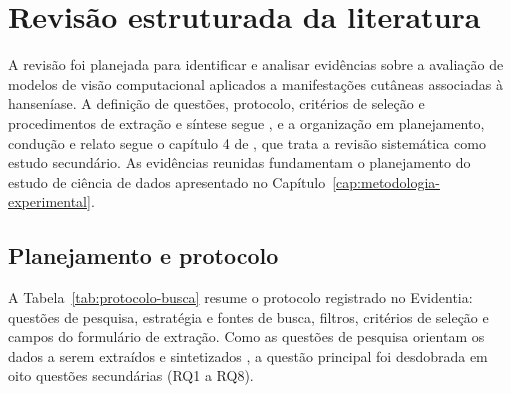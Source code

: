 \chapter{Revisão estruturada da literatura}
\label{cap:revisao-literatura}
\label{sec:conducao-revisao}

A revisão foi planejada para identificar e analisar evidências sobre a
avaliação de modelos de visão computacional aplicados a manifestações
cutâneas associadas à hanseníase. A definição de questões, protocolo,
critérios de seleção e procedimentos de extração e síntese segue
, e a organização em planejamento, condução e
relato segue o capítulo 4 de , que trata a revisão
sistemática como estudo secundário. As evidências reunidas fundamentam o
planejamento do estudo de ciência de dados apresentado no
Capítulo~\ref{cap:metodologia-experimental}.

\section{Planejamento e protocolo}
\label{sec:planejamento-protocolo}

A Tabela~\ref{tab:protocolo-busca} resume o protocolo registrado no
Evidentia: questões de pesquisa, estratégia e fontes de busca, filtros,
critérios de seleção e campos do formulário de extração. Como as questões
de pesquisa orientam os dados a serem extraídos e sintetizados
\cite{kitchenham2007}, a questão principal foi desdobrada em oito
questões secundárias (RQ1 a RQ8).

